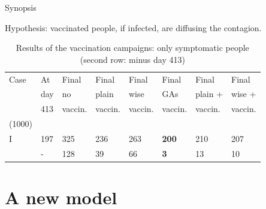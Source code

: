 \documentclass[9pt]{beamer}
\begin{document}
\begin{frame}{Synopsis}

\center
Hypothesis: vaccinated people, if infected, are diffusing the contagion.

\medskip

\begin{table}[H]
\centering
\begin{tabular}{llllllll}
\toprule
Case    & At   & Final      & Final        & Final       & Final   & Final       & Final       \\
             & day & no         & plain       & wise        & GAs       & plain  +     & wise +  \\
             & 413 & vaccin. & vaccin.    & vaccin.  & vaccin.   & vaccin.   & vaccin.      \\
 (1000) \\
\midrule
I            & 197 & 325 & 236 & 263 & \textbf{200} & 210 & 207  \\
             & -      & 128 & 39    & 66  & \textbf{3}    & 13    &  10  \\

\bottomrule  
\end{tabular}
\caption{Results of the vaccination campaigns: only symptomatic people (second row: minus day 413)}
\label{caseSynopsys}
\end{table}

\end{frame}
\section{A new model}
\end{document}
